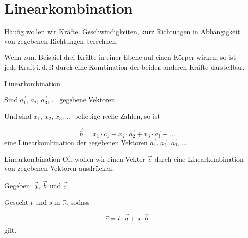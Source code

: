 \section{Linearkombination}


Häufig wollen wir Kräfte, Geschwindigkeiten, kurz Richtungen in
Abhängigkeit von gegebenen Richtungen berechnen.

Wenn zum Beispiel drei Kräfte in einer Ebene auf einen Körper wirken, so ist jede
Kraft i.\,d.\,R durch eine Kombination der beiden anderen Kräfte
darstellbar.

\begin{definition}{Linearkombination}{}

 
  Sind $\vec{a_1}$, $\vec{a_2}$, $\vec{a_3}$, ... gegebene Vektoren.

  Und sind $x_1$, $x_2$, $x_3$, ... beliebige reelle Zahlen, so ist

  $$\vec{b} = x_1\cdot{}\vec{a_1} +  x_2\cdot{}\vec{a_2} +
  x_3\cdot{}\vec{a_3} + ...$$
  eine Linearkombination der gegebenen Vektoren $\vec{a_1}$, $\vec{a_2}$, $\vec{a_3}$, ... 
\end{definition}


\begin{beispiel}{Linearkombination}{}
Oft wollen wir einen Vektor $\vec{c}$ durch eine Linearkombination von
gegebenen Vektoren ausdrücken.

Gegeben: $\vec{a\vphantom{b}}$, $\vec{b}$ und $\vec{c\vphantom{b}}$

Gesucht $t$ und $s$ in $\mathbb{R}$, sodass

$$\vec{c} = t\cdot{}\vec{a\vphantom{b}} + s\cdot{}\vec{b}$$
gilt.

\end{beispiel}

\newpage

